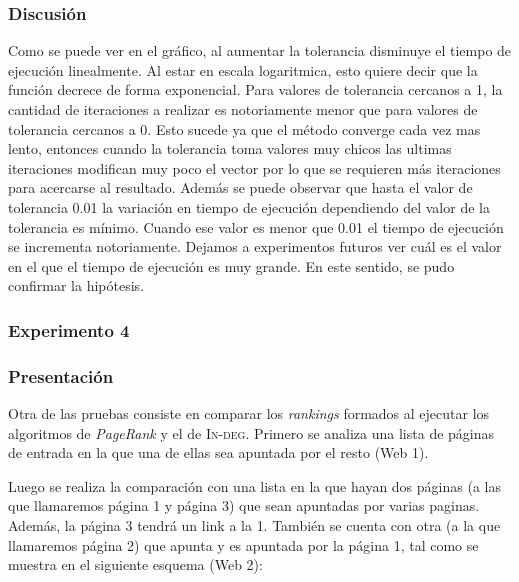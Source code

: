 			\subsubsection*{Discusión}
			Como se puede ver en el gráfico, al aumentar la tolerancia disminuye el tiempo de ejecución linealmente. Al estar en escala logaritmica, esto quiere decir que la función decrece de forma exponencial. Para valores de tolerancia cercanos a 1, la cantidad de iteraciones a realizar es notoriamente menor que para valores de tolerancia cercanos a 0. Esto sucede ya que el método converge cada vez mas lento, entonces cuando la tolerancia toma valores muy chicos las ultimas iteraciones modifican muy poco el vector por lo que se requieren más iteraciones para acercarse al resultado.
			Además se puede observar que hasta el valor de tolerancia 0.01 la variación en tiempo de ejecución dependiendo del valor de la tolerancia es mínimo. Cuando ese valor es menor que 0.01 el tiempo de ejecución se incrementa notoriamente. Dejamos a experimentos futuros ver cuál es el valor en el que el tiempo de ejecución es muy grande. En este sentido, se pudo confirmar la hipótesis.   

	\subsubsection{Experimento 4}
		\subsubsection*{Presentación}
		Otra de las pruebas consiste en comparar los \emph{rankings} formados al ejecutar los algoritmos de \emph{PageRank} y el de \textsc{In-deg}. Primero se analiza una lista de páginas de entrada en la que una de ellas sea apuntada por el resto (Web 1). 

		Luego se realiza la comparación con una lista en la que hayan dos páginas (a las que llamaremos página 1 y página 3) que sean apuntadas por varias paginas. Además, la página 3 tendrá un link a la 1. También se cuenta con otra (a la que llamaremos página 2) que apunta y es apuntada por la página 1, tal como se muestra en el siguiente esquema (Web 2):

